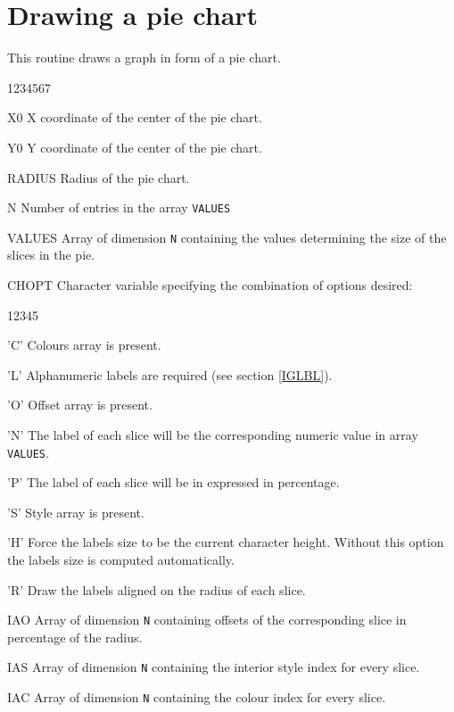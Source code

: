 \section{Drawing a pie chart}
\Action
This routine draws a graph in form of a pie chart.
\Pdesc
\begin{DLtt}{1234567}
\item[X0]     X coordinate of the center of the pie chart.
\item[Y0]     Y coordinate of the center of the pie chart.
\item[RADIUS] Radius of the pie chart.
\item[N]      Number of entries in the array {\tt VALUES}
\item[VALUES] Array of dimension {\tt N} containing the values determining
              the size of the slices in the pie.
\item[CHOPT]  Character variable specifying the combination of options
              desired:
\begin{DLtt}{12345}
\item['C'] Colours array is present.
\item['L'] Alphanumeric labels are required (see section \ref{IGLBL}).
\item['O'] Offset array is present.
\item['N'] The label of each slice will be the corresponding numeric value in
           array {\tt VALUES}.
\item['P'] The label of each slice will be in expressed in percentage.
\item['S'] Style array is present.
\item['H'] Force the labels size to be the current character height. Without
           this option the labels size is computed automatically.
\item['R'] Draw the labels aligned on the radius of each slice.
\end{DLtt}
\item[IAO] Array of dimension {\tt N} containing offsets of the corresponding
           slice in percentage of the radius.
\item[IAS] Array of dimension {\tt N} containing the interior style index for
           every slice.
\item[IAC] Array of dimension {\tt N} containing the colour index for every
           slice.
\end{DLtt}
\newpage

